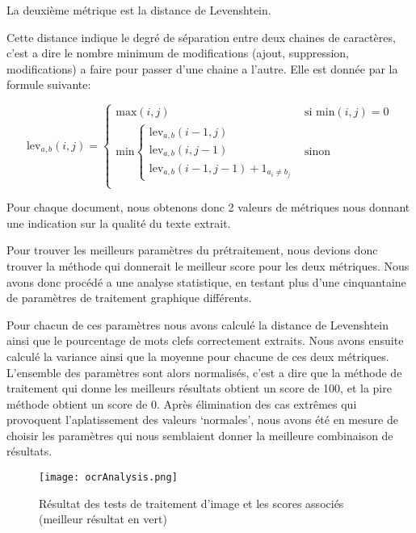 La deuxième métrique est la distance de Levenshtein.

Cette distance indique le degré de séparation entre deux chaines de caractères, c'est a dire le nombre minimum de modifications (ajout, suppression, modifications) a faire pour passer d'une chaine a l'autre. Elle est donnée par la formule suivante:

\begin{equation}
	\text{lev}_{a,b}(i,j) = \left\{\begin{matrix}
		\text{max}(i,j) & \text{si min}(i,j) = 0 \\ 
		\text{min}\left\{\begin{matrix}
			\text{lev}_{a,b}(i-1,j)\\ 
			\text{lev}_{a,b}(i,j-1)\\ 
			\text{lev}_{a,b}(i-1,j-1)+1_{a_i \neq b_j}
		\end{matrix}\right. & \text{sinon} \\ 
	\end{matrix}\right.
\end{equation}

Pour chaque document, nous obtenons donc 2 valeurs de métriques nous donnant une indication sur la qualité du texte extrait.

Pour trouver les meilleurs paramètres du prétraitement, nous devions donc trouver la méthode qui donnerait le meilleur score pour les deux métriques.
Nous avons donc procédé a une analyse statistique, en testant plus d'une cinquantaine de paramètres de traitement graphique différents.

Pour chacun de ces paramètres nous avons calculé la distance de Levenshtein ainsi que le pourcentage de mots clefs correctement extraits.
Nous avons ensuite calculé la variance ainsi que la moyenne pour chacune de ces deux métriques.
L'ensemble des paramètres sont alors normalisés, c'est a dire que la méthode de traitement qui donne les meilleurs résultats obtient un score de 100, et la pire méthode obtient un score de 0.
Après élimination des cas extrêmes qui provoquent l'aplatissement des valeurs `normales', nous avons été en mesure de choisir les paramètres qui nous semblaient donner la meilleure combinaison de résultats.


\begin{figure}[h!]
  \centering
  \texttt{[image: ocrAnalysis.png]}
	\caption[]{Résultat des tests de traitement d'image et les scores associés (meilleur résultat en vert)}
	\label{fig:ocrRes}
\end{figure}

